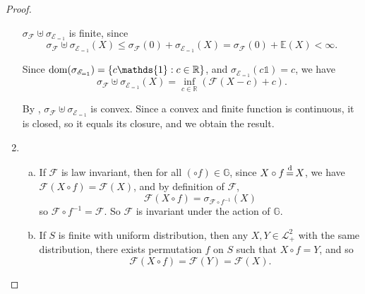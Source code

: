 \begin{proof}
\begin{enumerate}[(1)]
	$\sigma_{\mathscr{F}}\uplus\sigma_{\mathscr{E}_{=1}}$ is finite, since 
	$$\sigma_{\mathscr{F}}\uplus \sigma_{\mathscr{E}_{=1}}(X) 
	\le 
	\sigma_{\mathscr{F}}(0) + \sigma_{\mathscr{E}_{=1}}(X) 
	= 
	\sigma_{\mathscr{F}}(0) + \mathbb{E}(X)<\infty. $$
	
	Since $\dom(\sigma_{\mathscr{E}_{=1}}) = \{c\mathds{1}: c\in \mathbb{R}\}$, and $\sigma_{\mathscr{E}_{=1}}(c\mathds{1}) = c$, we have 
	$$
	\sigma_{\mathscr{F}}\uplus \sigma_{\mathscr{E}_{=1}}(X) 
	= 
	\inf_{c\in\mathbb{R}}(\mathcal{F}(X - c) + c).
	$$
	
	By \cite[Proposition 2.3.2]{hiriart-urrutyFundamentalsConvexAnalysis2001}, $\sigma_{\mathscr{F}}\uplus\sigma_{\mathscr{E}_{=1}}$ is convex. Since a convex and finite function is continuous, it is closed, so it equals its closure, and we obtain the result.
	\item 
	\begin{enumerate}[(a)]
		\item 	If \(\mathcal{F}\) is law invariant, then for all $(\circ f)\in \mathbb{G}$, since $X\circ f \operatorname*{\stackrel{\text {d}}{=}} X$, we have $\mathcal{F}(X\circ f) = \mathcal{F}(X)$, and by definition of $\mathscr{F}$, 
		$$\mathcal{F}(X \circ f) = \sigma_{\mathscr{F}\circ f^{-1}}(X)$$
		so $\mathscr{F}\circ f^{-1} = \mathscr{F}$. So $\mathscr{F}$ is invariant under the action of $\mathbb{G}$.
		
		\item If \(S\) is finite with uniform distribution, then any $X, Y\in \mathscr{L}_+^2$ with the same distribution, there exists permutation $f$ on $S$ such that $X \circ f = Y$, and so 
		$$\mathcal{F}(X\circ f ) = \mathcal{F}(Y) = \mathcal{F}(X).$$
	\end{enumerate}
\end{enumerate}
\end{proof}

